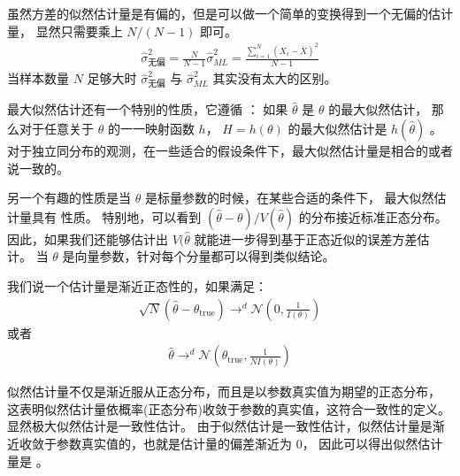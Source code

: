 \documentclass[letterpaper,10pt,english]{sphinxmanual}
\begin{document}
虽然方差的似然估计量是有偏的，但是可以做一个简单的变换得到一个无偏的估计量，
显然只需要乘上 \(N/(N-1)\) 即可。
\begin{equation}\label{equation:推断与检验/content:推断与检验/content:69}
\begin{split}\hat{\sigma}^2_{\text{无偏}} = \frac{ N}{N-1} \hat{\sigma}^2_{ML} = \frac{\sum_{i=1}^N (X_i - \bar{X})^2 }{N-1}\end{split}
\end{equation}
当样本数量 \(N\) 足够大时 \(\hat{\sigma}^2_{\text{无偏}}\) 与 \(\hat{\sigma}^2_{ML}\)
其实没有太大的区别。

最大似然估计还有一个特别的性质，它遵循 ：
如果 \(\hat{\theta}\) 是 \(\theta\) 的最大似然估计，
那么对于任意关于 \(\theta\) 的一一映射函数 \(h\)， \(H=h(\theta)\) 的最大似然估计是 \(h(\hat{\theta})\)
。对于独立同分布的观测，在一些适合的假设条件下，最大似然估计量是相合的或者说一致的。

另一个有趣的性质是当 \(\theta\) 是标量参数的时候，在某些合适的条件下，
最大似然估计量具有  性质。
特别地，可以看到 \((\hat{\theta}-\theta)/V(\hat{\theta})\)
的分布接近标准正态分布。
因此，如果我们还能够估计出 \(V(\hat{\theta}\)
就能进一步得到基于正态近似的误差方差估计。
当 \(\theta\) 是向量参数，针对每个分量都可以得到类似结论。

\begin{sphinxShadowBox}

我们说一个估计量是渐近正态性的，如果满足：
\begin{equation}\label{equation:推断与检验/content:推断与检验/content:70}
\begin{split}\sqrt{N}(\hat{\theta}- \theta_{\text{true}}) \rightarrow^d \mathcal{N}(0,\frac{1}{I(\theta)})\end{split}
\end{equation}
或者
\begin{equation}\label{equation:推断与检验/content:推断与检验/content:71}
\begin{split}\hat{\theta} \rightarrow^d \mathcal{N}(\theta_{\text{true}},\frac{1}{N I(\theta)})\end{split}
\end{equation}\end{sphinxShadowBox}

似然估计量不仅是渐近服从正态分布，而且是以参数真实值为期望的正态分布，
这表明似然估计量依概率(正态分布)收敛于参数的真实值，这符合一致性的定义。
显然极大似然估计是一致性估计。
由于似然估计是一致性估计，似然估计量是渐近收敛于参数真实值的，也就是估计量的偏差渐近为 \(0\)，
因此可以得出似然估计量是  。
\end{document}
